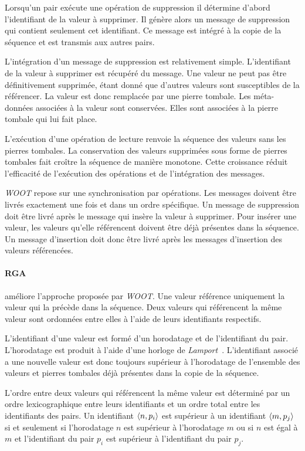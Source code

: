 Lorsqu'un pair exécute une opération de suppression il détermine d'abord l'identifiant de la valeur à supprimer.
Il génère alors un message de suppression qui contient seulement cet identifiant.
Ce message est intégré à la copie de la séquence et est transmis aux autres pairs.

L'intégration d'un message de suppression est relativement simple.
L'identifiant de la valeur à supprimer est récupéré du message.
Une valeur ne peut pas être définitivement supprimée, étant donné que d'autres valeurs sont susceptibles de la référencer.
La valeur est donc remplacée par une pierre tombale.
Les méta-données associées à la valeur sont conservées.
Elles sont associées à la pierre tombale qui lui fait place.

L'exécution d'une opération de lecture renvoie la séquence des valeurs sans les pierres tombales.
La conservation des valeurs supprimées sous forme de pierres tombales fait croître la séquence de manière monotone.
Cette croissance réduit l'efficacité de l'exécution des opérations et de l'intégration des messages.

\emph{WOOT} repose sur une synchronisation par opérations.
Les messages doivent être livrés exactement une fois et dans un ordre spécifique.
Un message de suppression doit être livré après le message qui insère la valeur  à supprimer.
Pour insérer une valeur, les valeurs qu'elle référencent doivent être déjà présentes dans la séquence.
Un message d'insertion doit donc être livré après les messages d'insertion des valeurs référencées.


\paragraph{\acf{RGA}}\autocite{roh_2011_rga} améliore l'approche proposée par \emph{WOOT}.
Une valeur référence uniquement la valeur qui la précède dans la séquence.
Deux valeurs qui référencent la même valeur sont ordonnées entre elles à l'aide de leurs identifiants respectifs.

L'identifiant d'une valeur est formé d'un horodatage et de l'identifiant du pair.
L'horodatage est produit à l'aide d'une horloge de \emph{Lamport}~\autocite{lamport_1978_time}.
L'identifiant associé a une nouvelle valeur est donc toujours supérieur à l'horodatage de l'ensemble des valeurs et pierres tombales déjà présentes dans la copie de la séquence.

L'ordre entre deux valeurs qui référencent la même valeur est déterminé par un ordre lexicographique entre leurs identifiants et un ordre total entre les identifiants des pairs.
Un identifiant $\tuple*{n,p_i}$ est supérieur à un identifiant $\tuple*{m,p_j}$ si et seulement si l'horodatage $n$ est supérieur à l'horodatage $m$ ou si $n$ est égal à $m$ et l'identifiant du pair $p_i$ est supérieur à l'identifiant du pair $p_j$.

